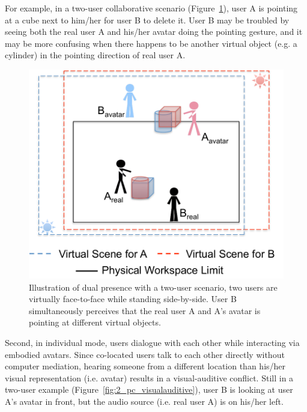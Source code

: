For example, in a two-user collaborative scenario (Figure~\ref{fig:2_pc_dualpresence}), user A is pointing at a cube next to him/her for user B to delete it. User B may be troubled by seeing both the real user A and his/her avatar doing the pointing gesture, and it may be more confusing when there happens to be another virtual object (e.g. a cylinder) in the pointing direction of real user A.

\begin{figure}[htb]
  \centering
  \includegraphics[width=.7\textwidth]{figures/ch2/pc_dualpresence}
  \caption{\label{fig:2_pc_dualpresence}Illustration of dual presence with a two-user scenario, two users are virtually face-to-face while standing side-by-side. User B simultaneously perceives that the real user A and A's avatar is pointing at different virtual objects.}
\end{figure}

Second, in individual mode, users dialogue with each other while interacting via embodied avatars. Since co-located users talk to each other directly without computer mediation, hearing someone from a different location than his/her visual representation (i.e. avatar) results in a visual-auditive conflict. Still in a two-user example (Figure~\ref{fig:2_pc_visualauditive}), user B is looking at user A's avatar in front, but the audio source (i.e. real user A) is on his/her left.


